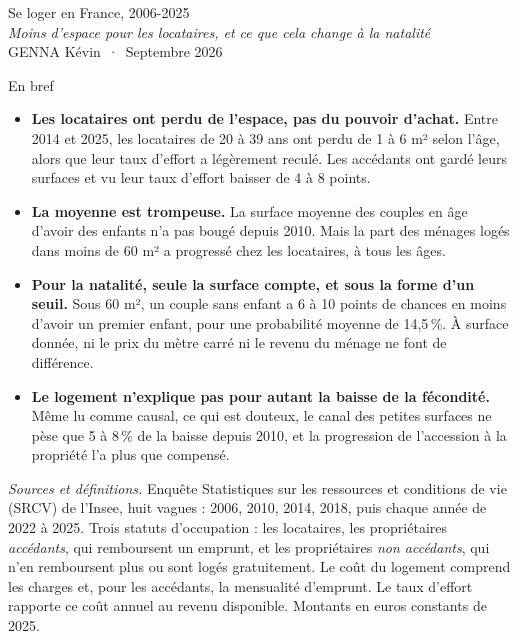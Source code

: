 \documentclass[11pt,a4paper]{article}
\begin{document}
{\headingfont\color{brandnavy}\fontsize{22}{26}\selectfont Se loger en France, 2006-2025}\\[0.25em]
{\headingfont\color{brandnavy}\large\itshape Moins d'espace pour les locataires, et ce que cela change à la natalité}\\[0.3em]
{\small\color{brandgrey} GENNA Kévin \,·\, Septembre 2026}

\vspace{0.4em}
\noindent\colorbox{fond}{\begin{minipage}{\dimexpr\linewidth-2\fboxsep\relax}
\vspace{0.2em}
{\headingfont\color{brandnavy}\large En bref}
\begin{itemize}[leftmargin=1.1em,itemsep=0.25em,topsep=0.3em]
	\item \textbf{Les locataires ont perdu de l'espace, pas du pouvoir d'achat.} Entre 2014 et 2025, les locataires de 20 à 39 ans ont perdu de 1 à 6 m² selon l'âge, alors que leur taux d'effort a légèrement reculé. Les accédants ont gardé leurs surfaces et vu leur taux d'effort baisser de 4 à 8 points.
	\item \textbf{La moyenne est trompeuse.} La surface moyenne des couples en âge d'avoir des enfants n'a pas bougé depuis 2010. Mais la part des ménages logés dans moins de 60 m² a progressé chez les locataires, à tous les âges.
	\item \textbf{Pour la natalité, seule la surface compte, et sous la forme d'un seuil.} Sous 60 m², un couple sans enfant a 6 à 10 points de chances en moins d'avoir un premier enfant, pour une probabilité moyenne de 14,5\,\%. À surface donnée, ni le prix du mètre carré ni le revenu du ménage ne font de différence.
	\item \textbf{Le logement n'explique pas pour autant la baisse de la fécondité.} Même lu comme causal, ce qui est douteux, le canal des petites surfaces ne pèse que 5 à 8\,\% de la baisse depuis 2010, et la progression de l'accession à la propriété l'a plus que compensé.
\end{itemize}
\vspace{0.1em}
\end{minipage}}

{\small\textit{Sources et définitions.} Enquête Statistiques sur les ressources et conditions de vie (SRCV) de l'Insee, huit vagues : 2006, 2010, 2014, 2018, puis chaque année de 2022 à 2025. Trois statuts d'occupation : les locataires, les propriétaires \textit{accédants}, qui remboursent un emprunt, et les propriétaires \textit{non accédants}, qui n'en remboursent plus ou sont logés gratuitement. Le coût du logement comprend les charges et, pour les accédants, la mensualité d'emprunt. Le taux d'effort rapporte ce coût annuel au revenu disponible. Montants en euros constants de 2025.}
\end{document}
